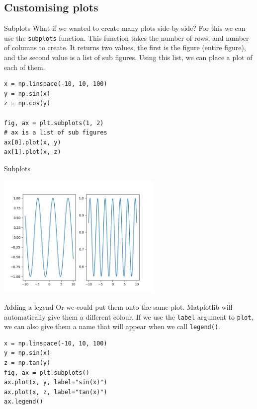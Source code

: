 \documentclass[10pt]{beamer}
\begin{document}
\subsection{Customising plots}
\label{sec:orgd358e71}

\begin{frame}[label={sec:org5966174},fragile]{Subplots}
 What if we wanted to create many plots side-by-side? For this we can use the
\texttt{subplots} function. This function takes the number of rows, and number of columns
to create. It returns two values, the first is the figure (entire figure), and
the second value is a list of sub figures. Using this list, we can place a plot
of each of them.

\begin{verbatim}
x = np.linspace(-10, 10, 100)
y = np.sin(x)
z = np.cos(y)

fig, ax = plt.subplots(1, 2)
# ax is a list of sub figures
ax[0].plot(x, y)
ax[1].plot(x, z)
\end{verbatim}
\end{frame}

\begin{frame}[label={sec:orgd7910c0}]{Subplots}
\begin{center}
\includegraphics[width=0.6\textwidth]{images/subplots.png}
\end{center}
\end{frame}

\begin{frame}[label={sec:org1e6a12f},fragile]{Adding a legend}
 Or we could put them onto the same plot. Matplotlib will automatically give them
a different colour. If we use the \texttt{label} argument to \texttt{plot}, we can also give them
a name that will appear when we call \texttt{legend()}.

\begin{verbatim}
x = np.linspace(-10, 10, 100)
y = np.sin(x)
z = np.tan(y)
fig, ax = plt.subplots()
ax.plot(x, y, label="sin(x)")
ax.plot(x, z, label="tan(x)")
ax.legend()
\end{verbatim}
\end{frame}
\end{document}
